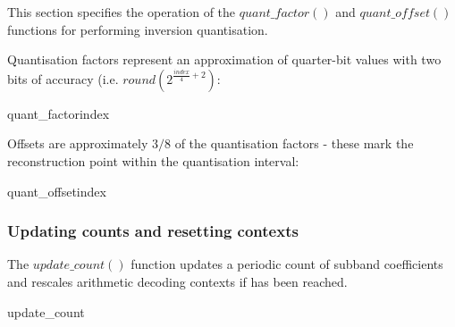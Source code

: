This section specifies the operation of the $quant\_factor()$ and 
$quant\_offset()$ functions for performing inversion quantisation.

Quantisation factors represent an approximation of quarter-bit values 
with two bits of accuracy (i.e. $round(2^{\frac{index}{4}+2})$:

\begin{pseudo}{quant\_factor}{index}
\bsEND
\end{pseudo}

Offsets are approximately $3/8$ of the quantisation factors - these
mark the reconstruction point within the quantisation interval:

\begin{pseudo}{quant\_offset}{index}
\end{pseudo}

\subsubsection{Updating counts and resetting contexts}
\label{updatecounts}

The $update\_count()$ function updates a periodic count of subband 
coefficients and rescales arithmetic decoding contexts if \CoefficientReset has been reached.

\begin{pseudo}{update\_count}{}
\bsIF{\CoefficientCount == \CoefficientReset}
  \bsEND
\bsEND
\end{pseudo}

